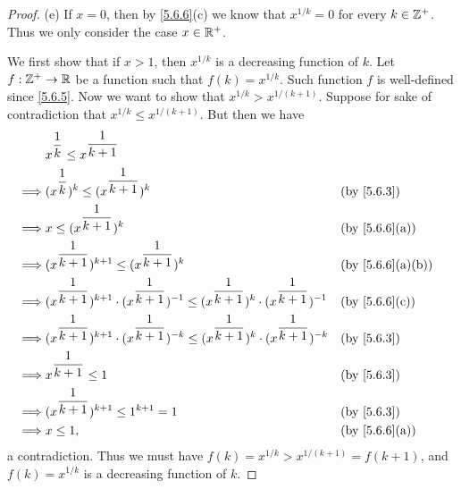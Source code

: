 \begin{proof}{(e)}
  If \(x = 0\), then by \cref{5.6.6}(c) we know that \(x^{1 / k} = 0\) for every \(k \in \mathbb{Z}^+\).
  Thus we only consider the case \(x \in \mathbb{R}^+\).

  We first show that if \(x > 1\), then \(x^{1 / k}\) is a decreasing function of \(k\).
  Let \(f : \mathbb{Z}^+ \to \mathbb{R}\) be a function such that \(f(k) = x^{1 / k}\).
  Such function \(f\) is well-defined since \cref{5.6.5}.
  Now we want to show that \(x^{1 / k} > x^{1 / (k + 1)}\).
  Suppose for sake of contradiction that \(x^{1 / k} \leq x^{1 / (k + 1)}\).
  But then we have
  \begin{align*}
             & x^{\dfrac{1}{k}} \leq x^{\dfrac{1}{k + 1}}                                                                                                                           \\
    \implies & (x^{\dfrac{1}{k}})^k \leq (x^{\dfrac{1}{k + 1}})^k                                                                               &  & \text{(by \cref{5.6.3})}       \\
    \implies & x \leq (x^{\dfrac{1}{k + 1}})^k                                                                                                  &  & \text{(by \cref{5.6.6}(a))}    \\
    \implies & (x^{\dfrac{1}{k + 1}})^{k + 1} \leq (x^{\dfrac{1}{k + 1}})^k                                                                     &  & \text{(by \cref{5.6.6}(a)(b))} \\
    \implies & (x^{\dfrac{1}{k + 1}})^{k + 1} \cdot (x^{\dfrac{1}{k + 1}})^{-1} \leq (x^{\dfrac{1}{k + 1}})^k \cdot (x^{\dfrac{1}{k + 1}})^{-1} &  & \text{(by \cref{5.6.6}(c))}    \\
    \implies & (x^{\dfrac{1}{k + 1}})^{k + 1} \cdot (x^{\dfrac{1}{k + 1}})^{-k} \leq (x^{\dfrac{1}{k + 1}})^k \cdot (x^{\dfrac{1}{k + 1}})^{-k} &  & \text{(by \cref{5.6.3})}       \\
    \implies & x^{\dfrac{1}{k + 1}} \leq 1                                                                                                      &  & \text{(by \cref{5.6.3})}       \\
    \implies & (x^{\dfrac{1}{k + 1}})^{k + 1} \leq 1^{k + 1} = 1                                                                                &  & \text{(by \cref{5.6.3})}       \\
    \implies & x \leq 1,                                                                                                                        &  & \text{(by \cref{5.6.6}(a))}
  \end{align*}
  a contradiction.
  Thus we must have \(f(k) = x^{1 / k} > x^{1 / (k + 1)} = f(k + 1)\), and \(f(k) = x^{1 / k}\) is a decreasing function of \(k\).


\end{proof}
